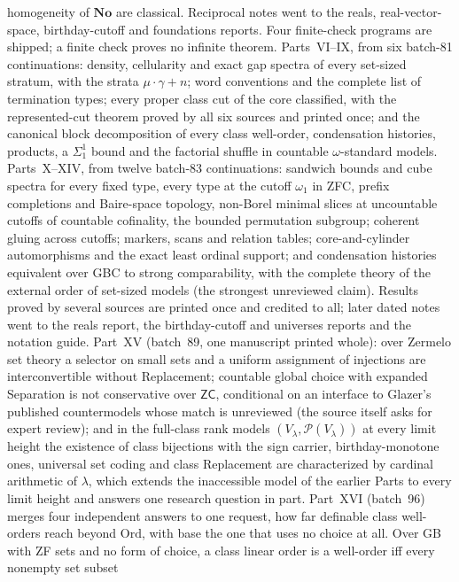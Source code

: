\documentclass[11pt]{article}
\newcommand{\No}{\mathbf{No}}
\begin{document}
{homogeneity of $\No$ are classical.  Reciprocal notes went to the reals,
real-vector-space, birthday-cutoff and foundations reports.  Four
finite-check programs are shipped; a finite check proves no infinite
theorem.  Parts~VI--IX, from six batch-81 continuations: density,
cellularity and exact gap spectra of every set-sized stratum, with the
strata $\mu\cdot\gamma+n$; word conventions and the complete list of
termination types; every proper class cut of the core classified, with
the represented-cut theorem proved by all six sources and printed once;
and the canonical block decomposition of every class well-order,
condensation histories, products, a $\Sigma^1_1$ bound and the factorial
shuffle in countable $\omega$-standard models.  Parts~X--XIV, from twelve
batch-83 continuations: sandwich bounds and cube spectra for every fixed
type, every type at the cutoff $\omega_1$ in ZFC, prefix completions and
Baire-space topology, non-Borel minimal slices at uncountable cutoffs of
countable cofinality, the bounded permutation subgroup; coherent gluing
across cutoffs; markers, scans and relation tables; core-and-cylinder
automorphisms and the exact least ordinal support; and condensation
histories equivalent over GBC to strong comparability, with the complete
theory of the external order of set-sized models (the strongest unreviewed
claim).  Results proved by several sources are printed once and credited
to all; later dated notes went to the reals report, the birthday-cutoff
and universes reports and the notation guide.  Part~XV (batch~89, one
manuscript printed whole): over Zermelo set theory a selector on small
sets and a uniform assignment of injections are interconvertible without
Replacement; countable global choice with expanded Separation is not
conservative over $\mathsf{ZC}$, conditional on an interface to Glazer's
published countermodels whose match is unreviewed (the source itself asks
for expert review); and in the full-class rank models
$(V_\lambda,\mathcal P(V_\lambda))$ at every limit height the existence of
class bijections with the sign carrier, birthday-monotone ones, universal
set coding and class Replacement are characterized by cardinal arithmetic
of $\lambda$, which extends the inaccessible model of the earlier Parts to
every limit height and answers one research question in part.
Part~XVI (batch~96) merges four independent answers to one request, how
far definable class well-orders reach beyond $\mathrm{Ord}$, with base the
one that uses no choice at all.  Over GB with ZF sets and no form of
choice, a class linear order is a well-order iff every nonempty set subset
}
\end{document}
